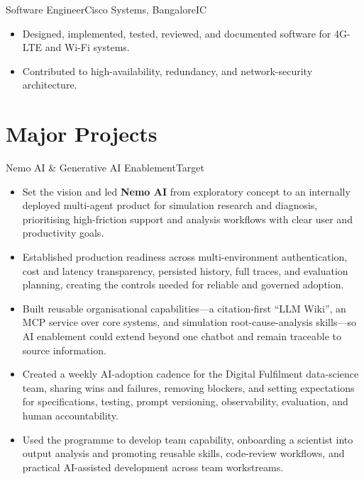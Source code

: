 \documentclass[11pt,a4paper]{moderncv}
\begin{document}
    {Software Engineer}{Cisco Systems, Bangalore}{}{IC}{
    \begin{itemize}
        \item Designed, implemented, tested, reviewed, and documented software for 4G-LTE and Wi-Fi systems.
        \item Contributed to high-availability, redundancy, and network-security architecture.
    \end{itemize}
    }


\hypertarget{major-projects}{
\section{Major Projects}\label{major-projects}}

\nopagebreak
    {Nemo AI \& Generative AI Enablement}{Target}{}{}{
    \begin{itemize}
        \item Set the vision and led \textbf{Nemo AI} from exploratory concept to an internally deployed multi-agent product for simulation research and diagnosis, prioritising high-friction support and analysis workflows with clear user and productivity goals.
        \item Established production readiness across multi-environment authentication, cost and latency transparency, persisted history, full traces, and evaluation planning, creating the controls needed for reliable and governed adoption.
        \item Built reusable organisational capabilities---a citation-first ``LLM Wiki'', an MCP service over core systems, and simulation root-cause-analysis skills---so AI enablement could extend beyond one chatbot and remain traceable to source information.
        \item Created a weekly AI-adoption cadence for the Digital Fulfilment data-science team, sharing wins and failures, removing blockers, and setting expectations for specifications, testing, prompt versioning, observability, evaluation, and human accountability.
        \item Used the programme to develop team capability, onboarding a scientist into output analysis and promoting reusable skills, code-review workflows, and practical AI-assisted development across team workstreams.
    \end{itemize}
    }
\end{document}
